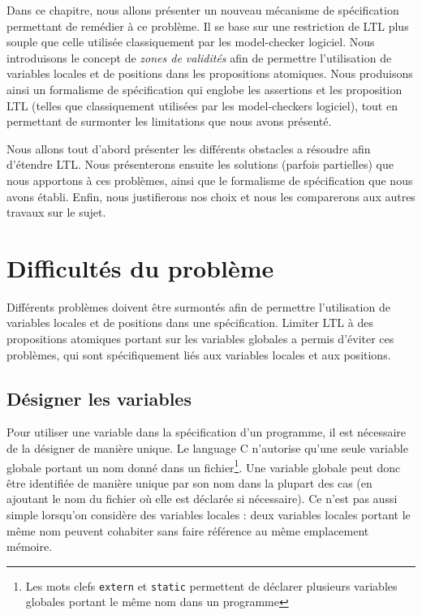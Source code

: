Dans ce chapitre, nous allons présenter un nouveau mécanisme de spécification
permettant de remédier à ce problème. Il se base sur une restriction de \ac{LTL}
plus souple que celle utilisée classiquement par les model-checker logiciel.
Nous introduisons le concept de \emph{zones de validités} afin de permettre
l'utilisation de variables locales et de positions dans les propositions
atomiques. Nous produisons ainsi un formalisme de spécification qui englobe les
assertions et les proposition LTL (telles que classiquement utilisées par les
model-checkers logiciel), tout en permettant de surmonter les limitations que
nous avons présenté.

Nous allons tout d'abord présenter les différents obstacles a résoudre afin
d'étendre \ac{LTL}. Nous présenterons ensuite les solutions (parfois partielles)
que nous apportons à ces problèmes, ainsi que le formalisme de spécification que
nous avons établi. Enfin, nous justifierons nos choix et nous les comparerons
aux autres travaux sur le sujet.

\section{Difficultés du problème}

Différents problèmes doivent être surmontés afin de permettre l'utilisation de
variables locales et de positions dans une spécification.
Limiter \ac{LTL} à des propositions atomiques portant sur les variables globales
a permis d'éviter ces problèmes, qui sont spécifiquement liés aux variables
locales et aux positions.

\subsection{Désigner les variables}

Pour utiliser une variable dans la spécification d'un programme, il est
nécessaire de la désigner de manière unique.
Le language C n'autorise qu'une seule variable globale portant un nom
donné dans un fichier\footnote{Les mots clefs \texttt{extern} et
\texttt{static} permettent de déclarer plusieurs variables globales
portant le même nom dans un programme}. Une variable globale peut donc être
identifiée de manière unique par son nom dans la plupart des cas (en ajoutant le
nom du fichier où elle est déclarée si nécessaire). Ce n'est pas
aussi simple lorsqu'on considère des variables locales : deux variables
locales portant le même nom peuvent cohabiter sans faire référence au
même emplacement mémoire.

